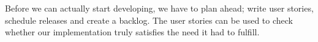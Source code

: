 Before we can actually start developing, we have to plan ahead; write user stories, schedule releases and create a backlog. The user stories can be used to check whether our implementation truly satisfies the need it had to fulfill.